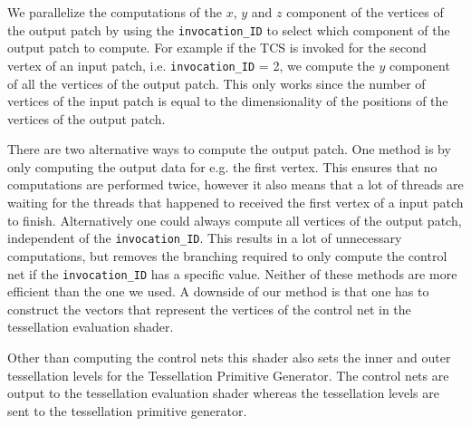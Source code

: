 		We parallelize the computations of the $x$, $y$ and $z$ component of the vertices of the output patch by using the \texttt{invocation\_ID} to select which component of the output patch to compute. For example if the TCS is invoked for the second vertex of an input patch, i.e. \texttt{invocation\_ID} = 2, we compute the $y$ component of all the vertices of the output patch. This only works since the number of vertices of the input patch is equal to the dimensionality of the positions of the vertices of the output patch.

		There are two alternative ways to compute the output patch. One method is by only computing the output data for e.g. the first vertex. This ensures that no computations are performed twice, however it also means that a lot of threads are waiting for the threads that happened to received the first vertex of a input patch to finish.  
		Alternatively one could always compute all vertices of the output patch, independent of the \texttt{invocation\_ID}. This results in a lot of unnecessary computations, but removes the branching required to only compute the control net if the \texttt{invocation\_ID} has a specific value. Neither of these methods are more efficient than the one we used. A downside of our method is that one has to construct the vectors that represent the vertices of the control net in the tessellation evaluation shader. 

		Other than computing the control nets this shader also sets the inner and outer tessellation levels for the Tessellation Primitive Generator. 
		The control nets are output to the tessellation evaluation shader whereas the tessellation levels are sent to the tessellation primitive generator. 

